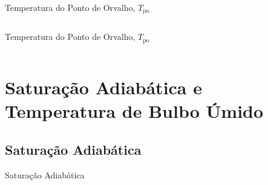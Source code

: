     \begin{frame}{Temperatura do Ponto de Orvalho, $T_{\mathrm{po}}$}\vspace*{-2em}
        \begin{columns}
        \end{columns}
    \end{frame}

    \begin{frame}{Temperatura do Ponto de Orvalho, $T_{\mathrm{po}}$}\vspace*{-2em}
        \begin{columns}
        \end{columns}
    \end{frame}

\section{Saturação Adiabática e Temperatura de Bulbo Úmido}

\subsection{Saturação Adiabática}

    \begin{frame}{Saturação Adiabática}\vspace*{-2em}
    \end{frame}

